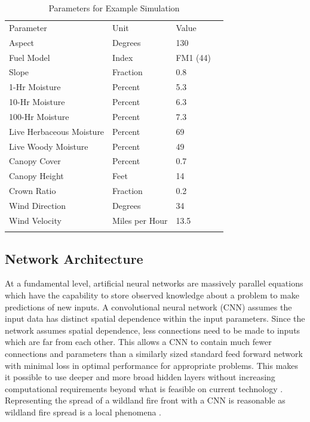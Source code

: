 \documentclass[twocolumn]{svjour3}          %
\begin{document}
\begin{table}[htb]
\centering
\caption{Parameters for Example Simulation}
\label{tab:paramsExample}       %
\begin{tabular}{llll}
\hline\noalign{\smallskip}
Parameter & Unit & Value \\
\noalign{\smallskip}\hline\noalign{\smallskip}
Aspect & Degrees & 130 \\
Fuel Model & Index & FM1 (44) \\
Slope & Fraction & 0.8 \\
\hline
1-Hr Moisture & Percent & 5.3 \\
10-Hr Moisture & Percent & 6.3 \\
100-Hr Moisture & Percent & 7.3 \\
Live Herbaceous Moisture & Percent & 69 \\
Live Woody Moisture & Percent & 49 \\
\hline
Canopy Cover & Percent & 0.7 \\
Canopy Height & Feet & 14 \\
Crown Ratio & Fraction & 0.2 \\
\hline
Wind Direction & Degrees & 34 \\
Wind Velocity & Miles per Hour & 13.5 \\
\noalign{\smallskip}\hline
\end{tabular}
\end{table}
















\subsection{Network Architecture}
\label{ss:Na}


At a fundamental level, artificial neural networks are massively parallel
equations which have the capability to store observed knowledge about a
problem to make predictions of new inputs. A convolutional neural network
(CNN) assumes the input data has distinct
spatial dependence within the input parameters. Since the network
assumes spatial dependence, less connections need to be made to
inputs which are far from each other. This allows a CNN to contain much
fewer connections and parameters than a similarly sized standard feed
forward network with minimal loss in optimal performance for appropriate
problems. This makes it possible to use deeper and more broad hidden
layers without increasing computational requirements beyond what is
feasible on current technology \cite{krizhevsky2012imagenet}.
Representing the spread of a wildland fire front with a CNN is
reasonable as wildland fire spread is a local phenomena \cite{finney1999mechanistic}.
\end{document}
